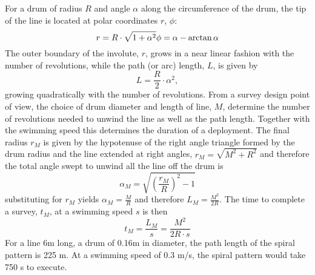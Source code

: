 
For a drum of radius $R$ and angle $\alpha$ along the circumference of the drum, the tip of the line is located at polar coordinates $r$, $\phi$:  
\begin{equation}
r = R\cdot\sqrt{1+\alpha^2} \\
\phi = \alpha - \arctan{\alpha} 
\end{equation}
The outer boundary of the involute, $r$, grows in a near linear fashion with the number of revolutions, while the path (or arc) length, $L$, is given by
\begin{equation}
L=\frac{R}{2}\cdot\alpha^2,
\end{equation}
growing quadratically with the number of revolutions. 
From a survey design point of view, the choice of drum diameter and length of line, $M$, determine the number of revolutions needed to unwind the line as well as the path length. Together with the swimming speed this determines the duration of a deployment. The final radius $r_M$ is given by the hypotenuse of the right angle triangle formed by the drum radius and the line extended at right angles, $r_M = \sqrt{M^2 + R^2}$ and therefore the total angle swept to unwind all the line off the drum is 
\begin{equation}
\alpha_M = \sqrt{\left(\frac{r_M}{R}\right)^2 - 1}
\end{equation}
substituting for $r_M$ yields $\alpha_M = \frac{M}{R}$ and therefore $L_M = \frac{M^2}{2R}$. The time to complete a survey, $t_M$, at a swimming speed $s$ is then
\begin{equation}
t_M = \frac{L_M}{s} = \frac{M^2}{2R\cdot s}
\end{equation}
For a line 6m long, a drum of 0.16m in diameter, the path length of the spiral pattern is 225 m. At a swimming speed of 0.3 m/s, the spiral pattern would take 750 s to execute.


    
  
  
  
  
  